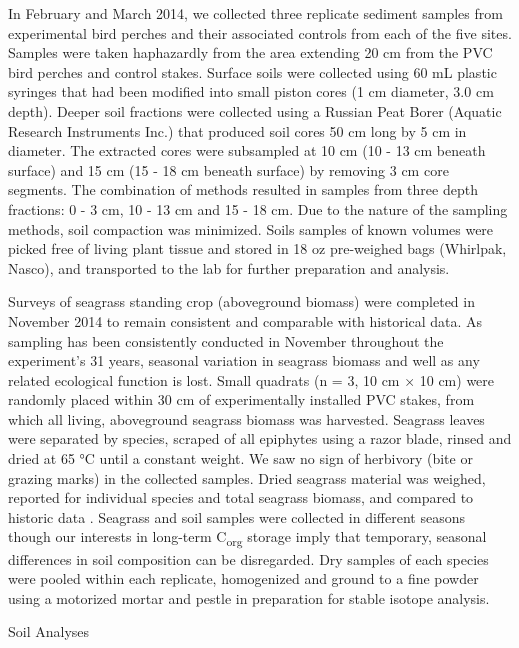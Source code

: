 In February and March 2014, we collected three replicate sediment samples from experimental bird perches and their associated controls from each of the five sites. Samples were taken haphazardly from the area extending 20 cm from the PVC bird perches and control stakes. Surface soils were collected using 60 mL plastic syringes that had been modified into small piston cores (1 cm diameter, 3.0 cm depth). Deeper soil fractions were collected using a Russian Peat Borer (Aquatic Research Instruments Inc.) that produced soil cores 50 cm long by 5 cm in diameter. The extracted cores were subsampled at 10 cm (10 - 13 cm beneath surface) and 15 cm (15 - 18 cm beneath surface) by removing 3 cm core segments. The combination of methods resulted in samples from three depth fractions: 0 - 3 cm, 10 - 13 cm and 15 - 18 cm. Due to the nature of the sampling methods, soil compaction was minimized. Soils samples of known volumes were picked free of living plant tissue and stored in 18 oz pre-weighed bags (Whirlpak, Nasco), and transported to the lab for further preparation and analysis.

Surveys of seagrass standing crop (aboveground biomass) were completed in November 2014 to remain consistent and comparable with historical data. As sampling has been consistently conducted in November throughout the experiment’s 31 years, seasonal variation in seagrass biomass and well as any related ecological function is lost. Small quadrats (n = 3, 10 cm × 10 cm) were randomly placed within 30 cm of experimentally installed PVC stakes, from which all living, aboveground seagrass biomass was harvested. Seagrass leaves were separated by species, scraped of all epiphytes using a razor blade, rinsed and dried at 65 °C until a constant weight. We saw no sign of herbivory (bite or grazing marks) in the collected samples. Dried seagrass material was weighed, reported for individual species and total seagrass biomass, and compared to historic data \citep{Powell:1989tt, Powell:1991va, Fourqurean:1995uj, Herbert:2008di}. Seagrass and soil samples were collected in different seasons though our interests in long-term C\textsubscript{org} storage imply that temporary, seasonal differences in soil composition can be disregarded. Dry samples of each species were pooled within each replicate, homogenized and ground to a fine powder using a motorized mortar and pestle in preparation for stable isotope analysis.

\newpage


\noindent Soil Analyses
\medskip


